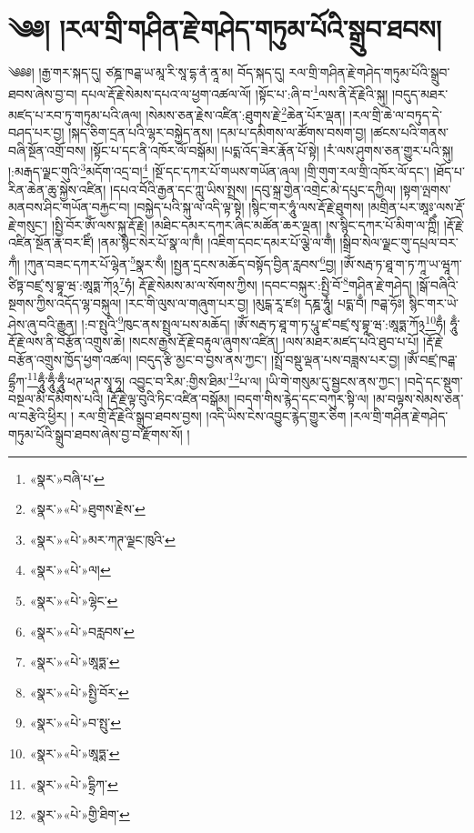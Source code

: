 \chapter{༄༅། །རལ་གྲི་གཤིན་རྗེ་གཤེད་གཏུམ་པོའི་སྒྲུབ་ཐབས།}༄༅༅། །རྒྱ་གར་སྐད་དུ། ཙཎྜ་ཁཌྒ་ཡ་མཱ་རི་སཱ་དྷ་ནཾ་ནཱ་མ། བོད་སྐད་དུ། རལ་གྲི་གཤིན་རྗེ་གཤེད་གཏུམ་པོའི་སྒྲུབ་ཐབས་ཞེས་བྱ་བ། དཔལ་རྡོ་རྗེ་སེམས་དཔའ་ལ་ཕྱག་འཚལ་ལོ། །སྟོང་པ་:ཞི་བ་\footnote{«སྣར་»བཞི་པ་}ལས་ནི་རྡོ་རྗེའི་སྐུ། །བདུད་མཐར་མཛད་པ་རབ་ཏུ་གཏུམ་པའི་ཞལ། །སེམས་ཅན་རྗེས་འཛིན་:ཐུགས་རྗེ་\footnote{«སྣར་»«པེ་»ཐུགས་རྗེས་}ཆེན་པོར་ལྡན། །རལ་གྲི་ཆེ་ལ་བཏུད་དེ་བཤད་པར་བྱ། །སྐད་ཅིག་དྲན་པའི་ལྷར་བསྐྱེད་ནས། །དམ་པ་དམིགས་ལ་ཚོགས་བསག་བྱ། །ཚངས་པའི་གནས་བཞི་སྔོན་འགྲོ་བས། །སྟོང་པ་དང་ནི་འཁོར་ལོ་བསྒོམ། །པདྨ་འོད་ཟེར་རྣོན་པོ་སྟེ། །རཾ་ལས་ཤུགས་ཅན་གྱུར་པའི་སྐུ། །:མརྒད་ལྗང་གུའི་\footnote{«སྣར་»«པེ་»མར་ཀཊ་ལྗང་ཁུའི་}མདོག་འདྲ་བ།\footnote{«སྣར་»«པེ་»ལ།} །སྔོ་དང་དཀར་པོ་གཡས་གཡོན་ཞལ། །གྲི་གུག་རལ་གྲི་འཁོར་ལོ་དང་། །ཐོད་པ་རིན་ཆེན་ཆུ་སྐྱེས་འཛིན། །དཔའ་བོའི་རྒྱན་དང་ཀླུ་ཡིས་སྤྲས། །དབུ་སྐྲ་གྱེན་འགྲེང་མེ་དཔུང་དཀྱིལ། །སྟག་ལྤགས་མནབས་ཤིང་གཡོན་བརྐྱང་བ། །བསྐྱེད་པའི་སྐུ་ལ་འདི་ལྟ་སྟེ། །སྙིང་གར་ཧཱུཾ་ལས་རྡོ་རྗེ་ཐུགས། །མགྲིན་པར་ཨཱཿ་ལས་རྡོ་རྗེ་གསུང་། །སྤྱི་བོར་ཨོཾ་ལས་སྐུ་རྡོ་རྗེ། །མཐིང་དམར་དཀར་ཞིང་མཚོན་ཆར་ལྡན། །ས་སྙིང་དཀར་པོ་མིག་ལ་ཀྵིྃ། །རྡོ་རྗེ་འཛིན་སྔོན་རྣ་བར་ཛིཾ། །ནམ་སྙིང་སེར་པོ་སྣ་ལ་ཁྃ། །འཇིག་དབང་དམར་པོ་ལྕེ་ལ་གྃ། །སྒྲིབ་སེལ་ལྗང་གུ་དཔྲལ་བར་ཀྃ། །ཀུན་བཟང་དཀར་པོ་ལྷེན་\footnote{«སྣར་»«པེ་»ལྷེང་}སྣར་སྃ། །སྤྱན་དྲངས་མཆོད་བསྟོད་བྱིན་རླབས་\footnote{«སྣར་»«པེ་»བརླབས་}བྱ། །ཨོཾ་སརྦ་ཏ་ཐཱ་ག་ཏ་ཀཱ་ཡ་ཝཱཀ་ཙིཏྟ་བཛྲ་སྭ་བྷཱ་ཝ་:ཨཱཏྨ་ཀོ྅\footnote{«སྣར་»«པེ་»ཨཱཏྨ་}ཧཾ། རྡོ་རྗེ་སེམས་མ་ལ་སོགས་ཀྱིས། །དབང་བསྐུར་:སྤྱི་བོ་\footnote{«སྣར་»«པེ་»སྤྱི་བོར་}གཤིན་རྗེ་གཤེད། །སྒོ་བཞིའི་སྔགས་ཀྱིས་འདོད་ལྷ་བསྐུལ། །རང་གི་ལུས་ལ་གཞུག་པར་བྱ། །མུངྒ་རཱ་ཛཿ། དཎྜ་ཧཱུཾ། པདྨ་བྃ། ཁཌྒ་ཧོཿ། སྙིང་གར་ཡེ་ཤེས་ཞུ་བའི་རྒྱུན། །:བ་སྤུའི་\footnote{«སྣར་»«པེ་»བ་སྤུ་}ཁུང་ནས་སྤྲུལ་པས་མཆོད། །ཨོཾ་སརྦ་ཏ་ཐཱ་ག་ཏ་པཱུ་ཛ་བཛྲ་སྭ་བྷཱ་ཝ་:ཨཱཏྨ་ཀོ྅\footnote{«སྣར་»«པེ་»ཨཱཏྨ་}ཧྃ། ཧཱུྃ་རྡོ་རྗེ་ལས་ནི་བརྩོན་འགྲུས་ཆེ། །སངས་རྒྱས་རྡོ་རྗེ་བརྟུལ་ཞུགས་འཛིན། །ལས་མཐར་མཛད་པའི་ཐུབ་པ་པོ། །རྡོ་རྗེ་བརྩོན་འགྲུས་ཁྱོད་ཕྱག་འཚལ། །བདུད་རྩི་མྱང་བ་བྱས་ནས་ཀྱང་། །སྤྲོ་བསྡུ་ལྡན་པས་བཟླས་པར་བྱ། །ཨོཾ་བཛྲ་ཁཌྒ་དྷྲྀཀ་\footnote{«སྣར་»«པེ་»དྷྲིཀ་}ཧཱུྃ་ཧཱུྃ་ཧཱུྃ་ཕཊ་ཕཊ་སྭཱ་ཧཱ། འབྱུང་བ་རིམ་:གྱིས་ཐིམ་\footnote{«སྣར་»«པེ་»གྱི་ཐིག་}པ་ལ། །ཡི་གེ་གསུམ་དུ་སྦྱངས་ནས་ཀྱང་། །བདེ་དང་སྡུག་བསྔལ་མི་དམིགས་པའི། །རྡོ་རྗེ་ལྟ་བུའི་ཏིང་འཛིན་བསྒོམ། །བདག་གིས་རྙེད་དང་བཀུར་སྟི་ལ། །མ་བལྟས་སེམས་ཅན་ལ་བརྩེའི་ཕྱིར། །
རལ་གྲི་རྡོ་རྗེའི་སྒྲུབ་ཐབས་བྱས། །འདི་ཡིས་ངེས་འབྱུང་རྙེད་གྱུར་ཅིག །རལ་གྲི་གཤིན་རྗེ་གཤེད་གཏུམ་པོའི་སྒྲུབ་ཐབས་ཞེས་བྱ་བ་རྫོགས་སོ། ། 